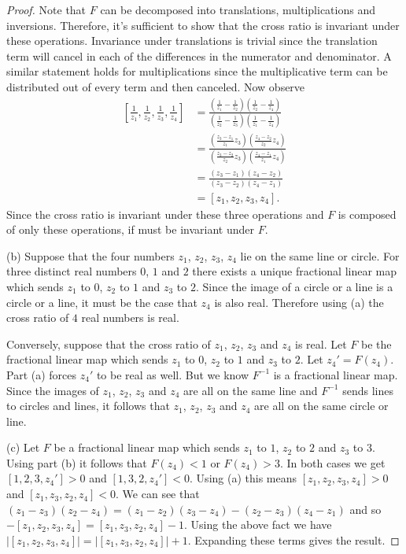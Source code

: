 \documentclass{article}
\begin{document}
\begin{proof}
Note that $F$ can be decomposed into translations, multiplications and inversions. Therefore, it's sufficient to show that the cross ratio is invariant under these operations. Invariance under translations is trivial since the translation term will cancel in each of the differences in the numerator and denominator. A similar statement holds for multiplications since the multiplicative term can be distributed out of every term and then canceled. Now observe
\begin{align*}
\left [ \frac{1}{z_1}, \frac{1}{z_2}, \frac{1}{z_3}, \frac{1}{z_4} \right ]
&= \frac{\left ( \frac{1}{z_1} - \frac{1}{z_2} \right ) \left ( \frac{1}{z_2} - \frac{1}{z_4} \right )}{ \left ( \frac{1}{z_2} - \frac{1}{z_3} \right ) \left ( \frac{1}{z_1} - \frac{1}{z_4} \right )}\\
&= \frac{\left ( \frac{z_3 - z_1}{z_1} z_3 \right ) \left ( \frac{z_4-z_2}{z_2} z_4 \right )}{\left ( \frac{z_3 - z_2}{z_2}z_3 \right ) \left ( \frac{z_4-z_1}{z_1} z_4 \right )}\\
&= \frac{(z_3-z_1)(z_4-z_2)}{(z_3-z_2)(z_4-z_1)}\\
& = [z_1, z_2, z_3, z_4].
\end{align*}
Since the cross ratio is invariant under these three operations and $F$ is composed of only these operations, if must be invariant under $F$.

(b) Suppose that the four numbers $z_1$, $z_2$, $z_3$, $z_4$ lie on the same line or circle. For three distinct real numbers $0$, $1$ and $2$ there exists a unique fractional linear map which sends $z_1$ to $0$, $z_2$ to $1$ and $z_3$ to $2$. Since the image of a circle or a line is a circle or a line, it must be the case that $z_4$ is also real. Therefore using (a) the cross ratio of $4$ real numbers is real.

Conversely, suppose that the cross ratio of $z_1$, $z_2$, $z_3$ and $z_4$ is real. Let $F$ be the fractional linear map which sends $z_1$ to $0$, $z_2$ to $1$ and $z_3$ to $2$. Let $z_4' = F(z_4)$. Part (a) forces $z_4'$ to be real as well. But we know $F^{-1}$ is a fractional linear map. Since the images of $z_1$, $z_2$, $z_3$ and $z_4$ are all on the same line and $F^{-1}$ sends lines to circles and lines, it follows that $z_1$, $z_2$, $z_3$ and $z_4$ are all on the same circle or line.

(c) Let $F$ be a fractional linear map which sends $z_1$ to $1$, $z_2$ to $2$ and $z_3$ to $3$. Using part (b) it follows that $F(z_4) < 1$ or $F(z_4) > 3$. In both cases we get $[1, 2, 3, z_4'] > 0$ and $[1, 3, 2, z_4'] < 0$. Using (a) this means $[z_1, z_2, z_3, z_4] > 0$ and $[z_1, z_3, z_2, z_4] < 0$. We can see that $(z_1 - z_3)(z_2 - z_4) = (z_1 - z_2)(z_3 - z_4) - (z_2 - z_3)(z_4 - z_1)$ and so $-[z_1, z_2, z_3, z_4] = [z_1, z_3, z_2, z_4] - 1$. Using the above fact we have $|[z_1, z_2, z_3, z_4]| = |[z_1, z_3, z_2, z_4]| + 1$. Expanding these terms gives the result.
\end{proof}
\end{document}
